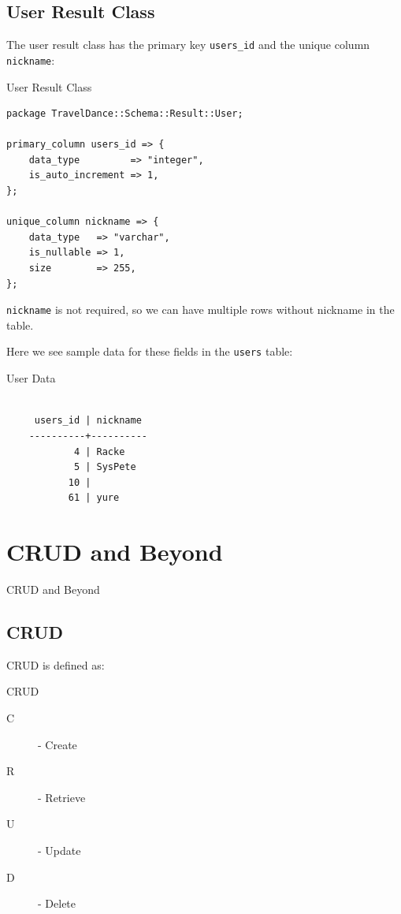 \subsection{User Result Class}

The user result class has the primary key \verb|users_id| and the
unique column \verb|nickname|:

\begin{frame}[fragile]{User Result Class}
\begin{lstlisting}
package TravelDance::Schema::Result::User;

primary_column users_id => {
    data_type         => "integer",
    is_auto_increment => 1,
};

unique_column nickname => {
    data_type   => "varchar",
    is_nullable => 1,
    size        => 255,
};
\end{lstlisting}
\end{frame}

\verb|nickname| is not required, so we can have multiple
rows without nickname in the table.

Here we see sample data for these fields in the
\verb|users| table:

\begin{frame}[fragile]{User Data}
\begin{lstlisting}

     users_id | nickname
    ----------+----------
            4 | Racke
            5 | SysPete
           10 |
           61 | yure

\end{lstlisting}
\end{frame}

\section{CRUD and Beyond}
\begin{frame}{CRUD and Beyond}
\end{frame}

\subsection{CRUD}

CRUD is defined as:

\begin{frame}{CRUD}
\begin{description}
\item[C] - Create
\item[R] - Retrieve
\item[U] - Update
\item[D] - Delete
\end{description}
\end{frame}

